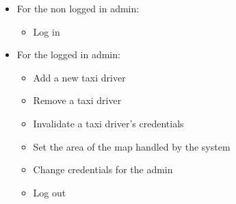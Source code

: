 \documentclass{article}
\begin{document}
\begin{itemize}
	\item For the non logged in admin:
		\begin{itemize}
			\item Log in
		\end{itemize}
	\item For the logged in admin:
		\begin{itemize}
			\item Add a new taxi driver
			\item Remove a taxi driver
			\item Invalidate a taxi driver's credentials 
			\item Set the area of the map handled by the system
			\item Change credentials for the admin
			\item Log out
		\end{itemize}
\end{itemize}
\end{document}
